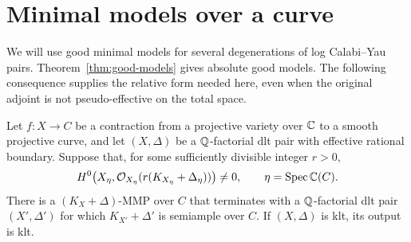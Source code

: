 \section{Minimal models over a curve}\label{sec:mmp}

We will use good minimal models for several degenerations of log
Calabi--Yau pairs.  Theorem~\ref{thm:good-models} gives absolute good
models.  The following consequence supplies the relative form needed
here, even when the original adjoint is not pseudo-effective on the
total space.

\begin{lemma}\label{lem:curve-mmp}
Let $f:X\to C$ be a contraction from a projective variety over $\mathbb C$ to
a smooth projective curve, and let $(X,\Delta)$ be a $\mathbb Q$-factorial dlt
pair with effective rational boundary.  Suppose that, for some sufficiently
divisible integer $r>0$,
\[
 H^0\bigl(X_\eta,\mathcal O_{X_\eta}(r(K_{X_\eta}+\Delta_\eta))\bigr)\ne0,
 \qquad \eta=\operatorname{Spec}\mathbb C(C).
\]
There is a $(K_X+\Delta)$-MMP over $C$ that terminates with a
$\mathbb Q$-factorial dlt pair $(X',\Delta')$ for which $K_{X'}+\Delta'$ is
semiample over $C$.  If $(X,\Delta)$ is klt, its output is klt.
\end{lemma}

